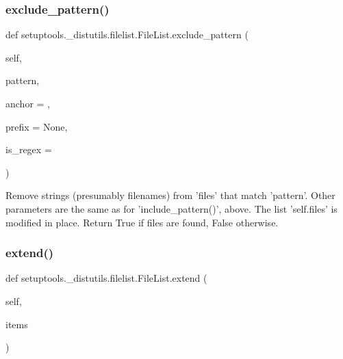 \subsubsection{\texorpdfstring{exclude\+\_\+pattern()}{exclude\_pattern()}}
{\footnotesize\ttfamily def setuptools.\+\_\+distutils.\+filelist.\+File\+List.\+exclude\+\_\+pattern (\begin{DoxyParamCaption}\item[{}]{self,  }\item[{}]{pattern,  }\item[{}]{anchor = {},  }\item[{}]{prefix = {\ttfamily None},  }\item[{}]{is\+\_\+regex = {} }\end{DoxyParamCaption})}

\begin{DoxyVerb}Remove strings (presumably filenames) from 'files' that match
'pattern'.  Other parameters are the same as for
'include_pattern()', above.
The list 'self.files' is modified in place.
Return True if files are found, False otherwise.
\end{DoxyVerb}
 \mbox{\label{classsetuptools_1_1__distutils_1_1filelist_1_1FileList_a857522eaf9de6edd66fc3937bf0af493}} 
\subsubsection{\texorpdfstring{extend()}{extend()}}
{\footnotesize\ttfamily def setuptools.\+\_\+distutils.\+filelist.\+File\+List.\+extend (\begin{DoxyParamCaption}\item[{}]{self,  }\item[{}]{items }\end{DoxyParamCaption})}

\mbox{\label{classsetuptools_1_1__distutils_1_1filelist_1_1FileList_ae50770e059c38abacfd2d4844f5cf3da}} 
